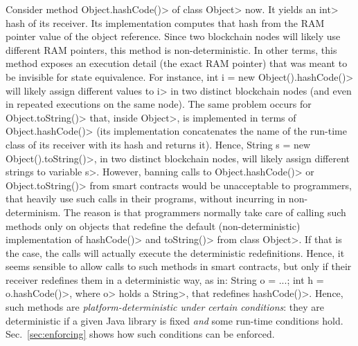 Consider method \<Object.hashCode()> of class \<Object> now. It yields an \<int>
hash of its receiver. Its implementation computes that hash from the
RAM pointer value of the object reference.
Since two blockchain nodes will likely use different RAM pointers,
this method is non-deterministic.
In other terms, this method exposes an execution detail (the exact RAM pointer)
that was meant to be invisible for state equivalence.
For instance,
\<int i = new Object().hashCode()>
will likely assign different values to \<i>
in two distinct blockchain nodes
(and even in repeated executions on the same node).
The same problem occurs for \<Object.toString()> that, inside
\<Object>, is implemented in terms of \<Object.hashCode()> (its
implementation concatenates
the name of the run-time class of its receiver with its hash and returns it).
Hence, \<String s = new Object().toString()>,
in two distinct blockchain nodes,
will likely assign different strings to variable \<s>.
However, banning calls to \<Object.hashCode()> or \<Object.toString()>
from smart contracts would be unacceptable to programmers, that
heavily use such calls in their programs, without incurring in
non-determinism. The reason is that programmers normally
take care of calling such methods only on objects that redefine
the default (non-deterministic) implementation of
\<hashCode()> and \<toString()> from class \<Object>.
If that is the case, the calls will actually
execute the deterministic redefinitions. Hence, it seems sensible
to allow calls to such methods in smart contracts, but only if their receiver
redefines them in a deterministic way, as in:
\<String o = ...; int h = o.hashCode()>,
where \<o> holds a \<String>, that redefines \<hashCode()>.
%
%
%
Hence, such methods are \emph{platform-deterministic under certain conditions}:
they are deterministic if a given Java library is fixed \emph{and} some run-time conditions hold.
Sec.~\ref{sec:enforcing} shows how such conditions can be enforced.

